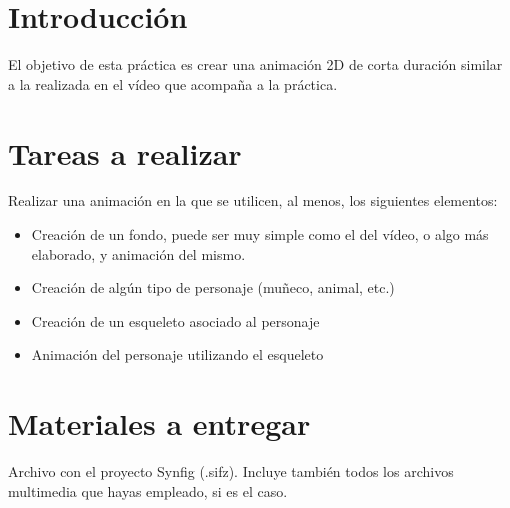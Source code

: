\documentclass[es,practica]{uah}
\begin{document}

\maketitle




\section{Introducción}

El objetivo de esta práctica es crear una animación 2D de corta duración similar a la realizada en el vídeo que acompaña a la práctica. 

\section{Tareas a realizar}

Realizar una animación en la que se utilicen, al menos, los siguientes elementos:

\begin{itemize}
	\item Creación de un fondo, puede ser muy simple como el del vídeo, o algo más elaborado, y animación del mismo.
	\item Creación de algún tipo de personaje (muñeco, animal, etc.)
	\item Creación de un esqueleto asociado al personaje
	\item Animación del personaje utilizando el esqueleto
\end{itemize}

\section{Materiales a entregar}

Archivo con el proyecto Synfig (.sifz). Incluye también todos los archivos multimedia que hayas empleado, si es el caso.
\end{document}
